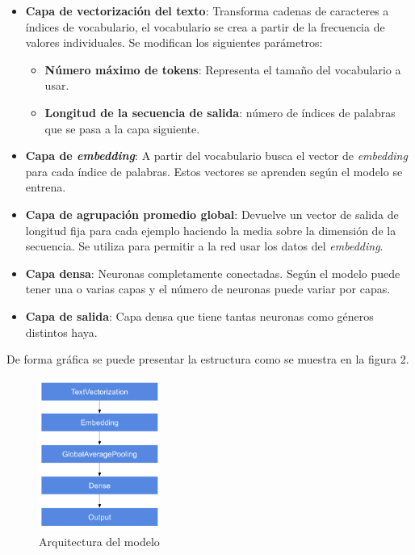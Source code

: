 \documentclass[12pt,a4paper, xcolor=table]{article}
\begin{document}
\begin{itemize}
\item \textbf{Capa de vectorización del texto}: Transforma cadenas de caracteres a índices de vocabulario, el vocabulario se crea a partir de la frecuencia de valores individuales. Se modifican los siguientes parámetros:
\begin{itemize}
\item \textbf{Número máximo de tokens}: Representa el tamaño del vocabulario a usar.
\item \textbf{Longitud de la secuencia de salida}: número de índices de palabras que se pasa a la capa siguiente.
\end{itemize}

\item \textbf{Capa de \textit{embedding}}: A partir del vocabulario busca el vector de \textit{embedding} para cada índice de palabras. Estos vectores se aprenden según el modelo se entrena.

\item \textbf{Capa de agrupación promedio global}: Devuelve un vector de salida de longitud fija para cada ejemplo haciendo la media sobre la dimensión de la secuencia. Se utiliza para permitir a la red usar los datos del \textit{embedding}.

\item \textbf{Capa densa}: Neuronas completamente conectadas. Según el modelo puede tener una o varias capas y el número de neuronas puede variar por capas.

\item \textbf{Capa de salida}: Capa densa que tiene tantas neuronas como géneros distintos haya.

\end{itemize}

De forma gráfica se puede presentar la estructura como se muestra en la figura 2.

  \begin{figure}[!h]
    \centering
    \includegraphics[width=150px]{img/Arquitectura.png}
    \caption{Arquitectura del modelo}
    \end{figure}
\end{document}
